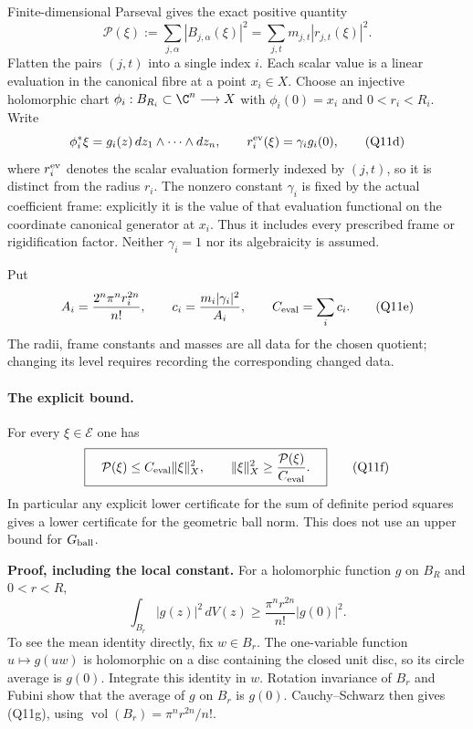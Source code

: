 Finite-dimensional Parseval gives the exact positive quantity
\[
 \mathcal P(\xi):=\sum_{j,\alpha}|B_{j,\alpha}(\xi)|^2
          =\sum_{j,t}m_{j,t}|r_{j,t}(\xi)|^2.
 \tag{Q11c}
\]
Flatten the pairs $(j,t)$ into a single index $i$.  Each scalar
value is a linear evaluation in the canonical fibre at a point
$x_i\in X$.  Choose an injective holomorphic chart
$\phi_i:B_{R_i}\subset\C^n\longrightarrow X$ with
$\phi_i(0)=x_i$ and $0<r_i<R_i$.  Write
\[
 \phi_i^*\xi=g_i(z)\,dz_1\wedge\cdots\wedge dz_n,
 \qquad r_i^{\rm ev}(\xi)=\gamma_i g_i(0),
 \tag{Q11d}
\]
where $r_i^{\rm ev}$ denotes the scalar evaluation formerly
indexed by $(j,t)$, so it is distinct from the radius $r_i$.
The nonzero constant $\gamma_i$ is fixed by the actual
coefficient frame: explicitly it is the value of that
evaluation functional on the coordinate canonical generator
at $x_i$.  Thus it includes every prescribed frame or
rigidification factor.  Neither $\gamma_i=1$ nor its
algebraicity is assumed.

Put
\[
 A_i=\frac{2^n\pi^n r_i^{2n}}{n!},\qquad
 c_i=\frac{m_i|\gamma_i|^2}{A_i},\qquad
 C_{\rm eval}=\sum_i c_i.
 \tag{Q11e}
\]
The radii, frame constants and masses are all data for the
chosen quotient; changing its level requires recording the
corresponding changed data.

\paragraph{The explicit bound.}
For every $\xi\in\mathcal E$ one has
\[
 \boxed{\quad
       \mathcal P(\xi)\leq C_{\rm eval}\|\xi\|_X^2,
       \qquad
       \|\xi\|_X^2\geq
                \frac{\mathcal P(\xi)}{C_{\rm eval}}.
       \quad}
 \tag{Q11f}
\]
In particular any explicit lower certificate for the sum of
definite period squares gives a lower certificate for the
geometric ball norm.  This does not use an upper bound for
$G_{\rm ball}$.

\textbf{Proof, including the local constant.}
For a holomorphic function $g$ on $B_R$ and $0<r<R$,
\[
       \int_{B_r}|g(z)|^2\,dV(z)
          \geq \frac{\pi^n r^{2n}}{n!}|g(0)|^2.
 \tag{Q11g}
\]
To see the mean identity directly, fix $w\in B_r$.  The
one-variable function $u\mapsto g(uw)$ is holomorphic on a
disc containing the closed unit disc, so its circle average is
$g(0)$.  Integrate this identity in $w$.  Rotation invariance
of $B_r$ and Fubini show that the average of $g$ on $B_r$ is
$g(0)$.  Cauchy--Schwarz then gives (Q11g), using
$\operatorname{vol}(B_r)=\pi^nr^{2n}/n!$.

